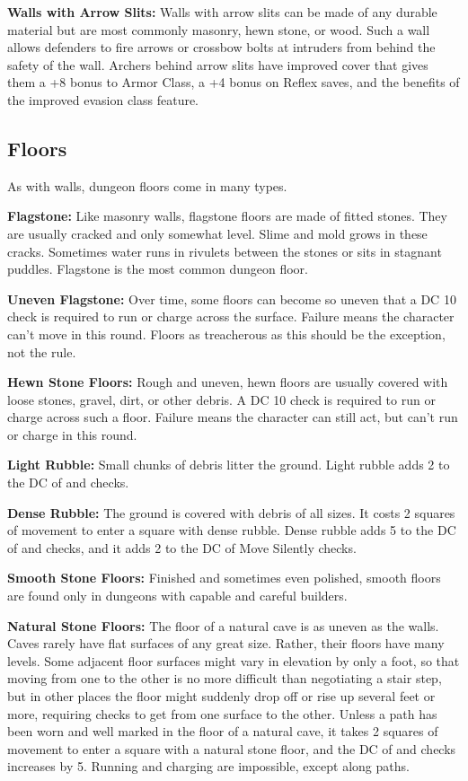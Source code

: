 \textbf{Walls with Arrow Slits:} Walls with arrow slits can be made of any durable material but are most commonly masonry, hewn stone, or wood. Such a wall allows defenders to fire arrows or crossbow bolts at intruders from behind the safety of the wall. Archers behind arrow slits have improved cover that gives them a +8 bonus to Armor Class, a +4 bonus on Reflex saves, and the benefits of the improved evasion class feature.

\subsection{Floors}
As with walls, dungeon floors come in many types.

\textbf{Flagstone:} Like masonry walls, flagstone floors are made of fitted stones. They are usually cracked and only somewhat level. Slime and mold grows in these cracks. Sometimes water runs in rivulets between the stones or sits in stagnant puddles. Flagstone is the most common dungeon floor.

\textbf{Uneven Flagstone:} Over time, some floors can become so uneven that a DC 10  check is required to run or charge across the surface. Failure means the character can't move in this round. Floors as treacherous as this should be the exception, not the rule.

\textbf{Hewn Stone Floors:} Rough and uneven, hewn floors are usually covered with loose stones, gravel, dirt, or other debris. A DC 10  check is required to run or charge across such a floor. Failure means the character can still act, but can't run or charge in this round.

\textbf{Light Rubble:} Small chunks of debris litter the ground. Light rubble adds 2 to the DC of  and  checks.

\textbf{Dense Rubble:} The ground is covered with debris of all sizes. It costs 2 squares of movement to enter a square with dense rubble. Dense rubble adds 5 to the DC of  and  checks, and it adds 2 to the DC of Move Silently checks.

\textbf{Smooth Stone Floors:} Finished and sometimes even polished, smooth floors are found only in dungeons with capable and careful builders.

\textbf{Natural Stone Floors:} The floor of a natural cave is as uneven as the walls. Caves rarely have flat surfaces of any great size. Rather, their floors have many levels. Some adjacent floor surfaces might vary in elevation by only a foot, so that moving from one to the other is no more difficult than negotiating a stair step, but in other places the floor might suddenly drop off or rise up several feet or more, requiring  checks to get from one surface to the other. Unless a path has been worn and well marked in the floor of a natural cave, it takes 2 squares of movement to enter a square with a natural stone floor, and the DC of  and  checks increases by 5. Running and charging are impossible, except along paths.

